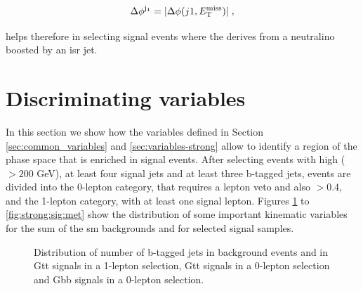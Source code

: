 \begin{equation}
{\Delta}\phi^{\mathrm{j}_1} = |{\Delta}{\phi}(j1, E_{\rm T}^{\mathrm{miss}})| \; ,
\end{equation}

\noindent helps therefore in selecting signal events where the \met derives from a neutralino boosted by an \gls{isr} jet. 


\section{Discriminating variables}

In this section we show how the variables defined in Section \ref{sec:common_variables} and \ref{sec:variables-strong} allow to 
identify a region of the phase space that is enriched in signal events. 
After selecting events with high \met ($> 200$ GeV), at least four signal jets and at least three b-tagged jets, events are
divided into the 0-lepton category, that requires a lepton veto and also \dphimin $>0.4$, and the 1-lepton category, 
with at least one signal lepton.
Figures \ref{fig:strong:sig:bjets_n} to \ref{fig:strong:sig:met} show the distribution of some important kinematic variables for 
the sum of the \gls{sm} backgrounds and for selected signal samples. 


\begin{figure}[h]
\centering 
{}
\caption{Distribution of number of b-tagged jets in background events and in  Gtt signals in a 1-lepton selection,
 Gtt signals in a 0-lepton selection and
 Gbb signals in a 0-lepton selection.
}\label{fig:strong:sig:bjets_n}
\end{figure}

